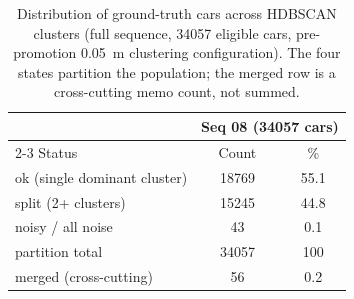 \documentclass[a4paper,12pt]{report}
\begin{document}
\begin{table}[H]
  \centering
  \caption[Ground truth cars across HDBSCAN clusters]{Distribution of ground-truth cars
    across HDBSCAN clusters (full sequence, \num{34057} eligible cars, pre-promotion
    \SI{0.05}{\metre} clustering configuration). The four states partition the population; the
    merged row is a cross-cutting memo count, not summed.}
  \label{tab:split}
  \begin{tabular}{lcc}
    \toprule
    & \multicolumn{2}{c}{Seq 08 (\num{34057} cars)} \\
    \cmidrule(lr){2-3}
    Status & Count & \% \\
    \midrule
    ok (single dominant cluster) & 18769 & 55.1 \\
    split (2+ clusters)          & 15245 & 44.8 \\
    noisy / all noise            & 43    & 0.1  \\
    \midrule
    partition total              & 34057 & 100  \\
    \addlinespace
    merged (cross-cutting) & 56 & 0.2 \\
    \bottomrule
  \end{tabular}
\end{table}
\end{document}
